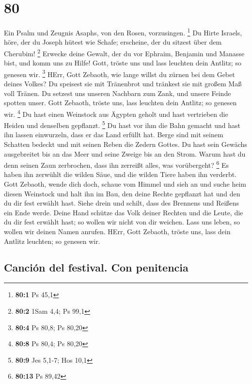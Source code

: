 \hypertarget{section-79}{%
\section{80}\label{section-79}}

 Ein Psalm und Zeugnis Asaphs, von den Rosen, vorzusingen.
\footnote{\textbf{80:1} Ps 45,1}  Du Hirte Israels, höre,
der du Joseph hütest wie Schafe; erscheine, der du sitzest über dem
Cherubim! \footnote{\textbf{80:2} 1Sam 4,4; Ps 99,1} 
Erwecke deine Gewalt, der du vor Ephraim, Benjamin und Manasse bist, und
komm uns zu Hilfe!  Gott, tröste uns und lass leuchten
dein Antlitz; so genesen wir. \footnote{\textbf{80:4} Ps 80,8; Ps 80,20}
 HErr, Gott Zebaoth, wie lange willst du zürnen bei dem
Gebet deines Volkes?  Du speisest sie mit Tränenbrot und
tränkest sie mit großem Maß voll Tränen.  Du setzest uns
unseren Nachbarn zum Zank, und unsere Feinde spotten unser.
 Gott Zebaoth, tröste uns, lass leuchten dein Antlitz; so
genesen wir. \footnote{\textbf{80:8} Ps 80,4; Ps 80,20} 
Du hast einen Weinstock aus Ägypten geholt und hast vertrieben die
Heiden und denselben gepflanzt. \footnote{\textbf{80:9} Jes 5,1-7; Hos
  10,1}  Du hast vor ihm die Bahn gemacht und hast ihn
lassen einwurzeln, dass er das Land erfüllt hat.  Berge
sind mit seinem Schatten bedeckt und mit seinen Reben die Zedern Gottes.
 Du hast sein Gewächs ausgebreitet bis an das Meer und
seine Zweige bis an den Strom.  Warum hast du denn seinen
Zaun zerbrochen, dass ihn zerreißt alles, was vorübergeht? \footnote{\textbf{80:13}
  Ps 89,42}  Es haben ihn zerwühlt die wilden Säue, und
die wilden Tiere haben ihn verderbt.  Gott Zebaoth, wende
dich doch, schaue vom Himmel und sieh an und suche heim diesen Weinstock
 und halt ihn im Bau, den deine Rechte gepflanzt hat und
den du dir fest erwählt hast.  Siehe drein und schilt,
dass des Brennens und Reißens ein Ende werde.  Deine Hand
schütze das Volk deiner Rechten und die Leute, die du dir fest erwählt
hast;  so wollen wir nicht von dir weichen. Lass uns
leben, so wollen wir deinen Namen anrufen.  HErr, Gott
Zebaoth, tröste uns, lass dein Antlitz leuchten; so genesen wir.

\hypertarget{canciuxf3n-del-festival.-con-penitencia}{%
\subsection{Canción del festival. Con
penitencia}\label{canciuxf3n-del-festival.-con-penitencia}}

